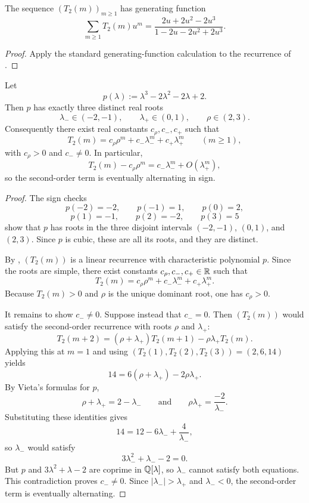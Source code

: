 \begin{corollary}
\label{cor:sigma-generating}
The sequence \((T_2(m))_{m\ge 1}\) has generating function
\[
  \sum_{m\ge 1}T_2(m)u^m
  =
  \frac{2u+2u^2-2u^3}{1-2u-2u^2+2u^3}.
\]
\end{corollary}

\begin{proof}
Apply the standard generating-function calculation to the recurrence of
.
\end{proof}

\begin{theorem}
\label{thm:alternating-second-order}
Let
\[
  p(\lambda):=\lambda^3-2\lambda^2-2\lambda+2.
\]
Then \(p\) has exactly three distinct real roots
\[
  \lambda_-\in(-2,-1),
  \qquad
  \lambda_+\in(0,1),
  \qquad
  \rho\in(2,3).
\]
Consequently there exist real constants \(c_\rho,c_-,c_+\) such that
\[
  T_2(m)=c_\rho\rho^m+c_-\lambda_-^m+c_+\lambda_+^m
  \qquad (m\ge 1),
\]
with \(c_\rho>0\) and \(c_-\neq 0\).  In particular,
\[
  T_2(m)-c_\rho\rho^m
  =
  c_-\lambda_-^m+O(\lambda_+^m),
\]
so the second-order term is eventually alternating in sign.
\end{theorem}

\begin{proof}
The sign checks
\[
  p(-2)=-2,\qquad p(-1)=1,\qquad p(0)=2,
\]
\[
  p(1)=-1,\qquad p(2)=-2,\qquad p(3)=5
\]
show that \(p\) has roots in the three disjoint intervals
\((-2,-1)\), \((0,1)\), and \((2,3)\).  Since \(p\) is cubic, these are all
its roots, and they are distinct.

By , \((T_2(m))\) is a linear recurrence with
characteristic polynomial \(p\).  Since the roots are simple, there exist
constants \(c_\rho,c_-,c_+\in\mathbb{R}\) such that
\[
  T_2(m)=c_\rho\rho^m+c_-\lambda_-^m+c_+\lambda_+^m.
\]
Because \(T_2(m)>0\) and \(\rho\) is the unique dominant root, one has
\(c_\rho>0\).

It remains to show \(c_-\neq 0\).  Suppose instead that \(c_-=0\).  Then
\((T_2(m))\) would satisfy the second-order recurrence with roots \(\rho\) and
\(\lambda_+\):
\[
  T_2(m+2)=(\rho+\lambda_+)T_2(m+1)-\rho\lambda_+T_2(m).
\]
Applying this at \(m=1\) and using \((T_2(1),T_2(2),T_2(3))=(2,6,14)\) yields
\[
  14=6(\rho+\lambda_+)-2\rho\lambda_+.
\]
By Vieta's formulas for \(p\),
\[
  \rho+\lambda_+=2-\lambda_-
  \qquad\text{and}\qquad
  \rho\lambda_+=\frac{-2}{\lambda_-}.
\]
Substituting these identities gives
\[
  14=12-6\lambda_-+\frac{4}{\lambda_-},
\]
so \(\lambda_-\) would satisfy
\[
  3\lambda_-^2+\lambda_--2=0.
\]
But \(p\) and \(3\lambda^2+\lambda-2\) are coprime in \(\mathbb{Q}[\lambda]\), so
\(\lambda_-\) cannot satisfy both equations.  This contradiction proves
\(c_-\neq 0\).  Since \(|\lambda_-|>\lambda_+\) and \(\lambda_-<0\), the
second-order term is eventually alternating.
\end{proof}

